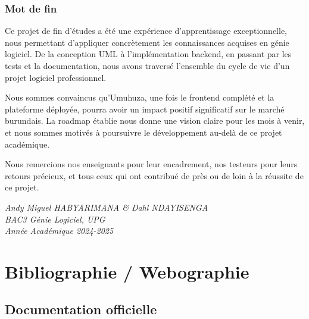 \subsection{Mot de fin}

Ce projet de fin d'études a été une expérience d'apprentissage exceptionnelle, nous permettant d'appliquer concrètement les connaissances acquises en génie logiciel. De la conception UML à l'implémentation backend, en passant par les tests et la documentation, nous avons traversé l'ensemble du cycle de vie d'un projet logiciel professionnel.

Nous sommes convaincus qu'Umuhuza, une fois le frontend complété et la plateforme déployée, pourra avoir un impact positif significatif sur le marché burundais. La roadmap établie nous donne une vision claire pour les mois à venir, et nous sommes motivés à poursuivre le développement au-delà de ce projet académique.

Nous remercions nos enseignants pour leur encadrement, nos testeurs pour leurs retours précieux, et tous ceux qui ont contribué de près ou de loin à la réussite de ce projet.

\vspace{1cm}

\begin{flushright}
\textit{Andy Miguel HABYARIMANA \& Dahl NDAYISENGA}\\
\textit{BAC3 Génie Logiciel, UPG}\\
\textit{Année Académique 2024-2025}
\end{flushright}

\chapter{Bibliographie / Webographie}

\section{Documentation officielle}

